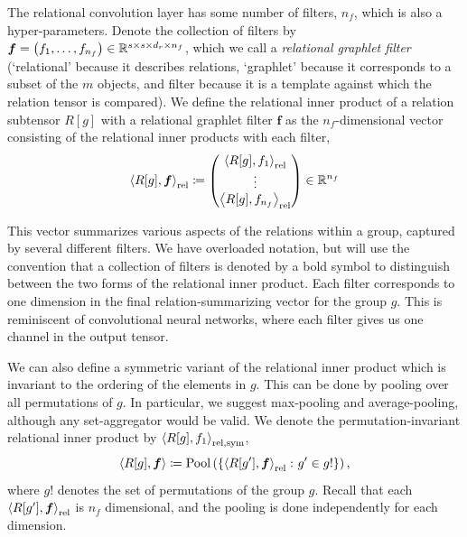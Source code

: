 The relational convolution layer has some number of filters, $n_f$, which is also a hyper-parameters. Denote the collection of filters by $\boldsymbol{f} = \left(f_1, \ldots, f_{n_f}\right) \in \mathbb{R}^{s \times s \times d_r \times n_f}$, which we call a \textit{relational graphlet filter} (`relational' because it describes relations, `graphlet' because it corresponds to a subset of the $m$ objects, and filter because it is a template against which the relation tensor is compared). We define the relational inner product of a relation subtensor $R[g]$ with a relational graphlet filter $\bm{f}$ as the $n_f$-dimensional vector consisting of the relational inner products with each filter,
\begin{equation}
    \label{eq:relational_inner_prod}
    \left\langle R[g], \bm{f} \right\rangle_\mathrm{rel} \coloneq \begin{pmatrix} \left\langle R[g], f_1 \right\rangle_\mathrm{rel} \\ \vdots 
 \\ \left\langle R[g], f_{n_f} \right\rangle_\mathrm{rel} \end{pmatrix} \in \mathbb{R}^{n_f}
\end{equation}

This vector summarizes various aspects of the relations within a group, captured by several different filters. We have overloaded notation, but will use the convention that a collection of filters is denoted by a bold symbol to distinguish between the two forms of the relational inner product. Each filter corresponds to one dimension in the final relation-summarizing vector for the group $g$. This is reminiscent of convolutional neural networks, where each filter gives us one channel in the output tensor.

We can also define a symmetric variant of the relational inner product which is invariant to the ordering of the elements in $g$. This can be done by pooling over all permutations of $g$. In particular, we suggest max-pooling and average-pooling, although any set-aggregator would be valid. We denote the permutation-invariant relational inner product by $\left \langle R[g], f_1 \right\rangle_{\mathrm{rel}, \mathrm{sym}}$,
\begin{equation}\label{eq:symmetric_relational_inner_prod}
    \left \langle R[g], \bm{f} \right\rangle \coloneq \mathrm{Pool}\left(\left\{\left\langle R[g'], \bm{f} \right\rangle_\mathrm{rel} \colon g' \in g!\right\}\right),
\end{equation}
\noindent where $g!$ denotes the set of permutations of the group $g$. Recall that each $\left \langle R[g'], \bm{f} \right\rangle_{\mathrm{rel}}$ is $n_f$ dimensional, and the pooling is done independently for each dimension.

